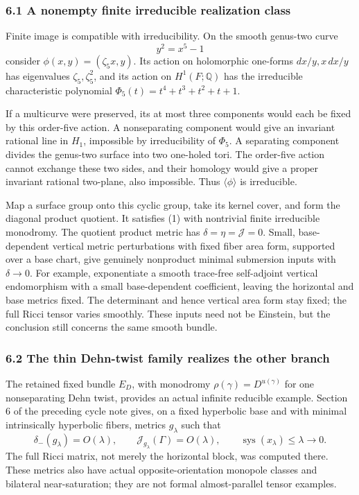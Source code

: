 \documentclass[
  11pt,
]{article}
\begin{document}
\hypertarget{a-nonempty-finite-irreducible-realization-class}{%
\subsubsection{6.1 A nonempty finite irreducible realization
class}\label{a-nonempty-finite-irreducible-realization-class}}

Finite image is compatible with irreducibility. On the smooth genus-two
curve \[
                           y^2=x^5-1
\tag{26}
\] consider \(\phi(x,y)=(\zeta_5x,y)\). Its action on holomorphic
one-forms \(dx/y,x\,dx/y\) has eigenvalues \(\zeta_5,\zeta_5^2\), and
its action on \(H^1(F;\mathbb Q)\) has the irreducible characteristic
polynomial \(\Phi_5(t)=t^4+t^3+t^2+t+1\).

If a multicurve were preserved, its at most three components would each
be fixed by this order-five action. A nonseparating component would give
an invariant rational line in \(H_1\), impossible by irreducibility of
\(\Phi_5\). A separating component divides the genus-two surface into
two one-holed tori. The order-five action cannot exchange these two
sides, and their homology would give a proper invariant rational
two-plane, also impossible. Thus \(\langle\phi\rangle\) is irreducible.

Map a surface group onto this cyclic group, take its kernel cover, and
form the diagonal product quotient. It satisfies (1) with nontrivial
finite irreducible monodromy. The quotient product metric has
\(\delta=\eta=\mathcal J=0\). Small, base-dependent vertical metric
perturbations with fixed fiber area form, supported over a base chart,
give genuinely nonproduct minimal submersion inputs with \(\delta\to0\).
For example, exponentiate a smooth trace-free self-adjoint vertical
endomorphism with a small base-dependent coefficient, leaving the
horizontal and base metrics fixed. The determinant and hence vertical
area form stay fixed; the full Ricci tensor varies smoothly. These
inputs need not be Einstein, but the conclusion still concerns the same
smooth bundle.

\hypertarget{the-thin-dehn-twist-family-realizes-the-other-branch}{%
\subsubsection{6.2 The thin Dehn-twist family realizes the other
branch}\label{the-thin-dehn-twist-family-realizes-the-other-branch}}

The retained fixed bundle \(E_D\), with monodromy
\(\rho(\gamma)=D^{u(\gamma)}\) for one nonseparating Dehn twist,
provides an actual infinite reducible example. Section 6 of the
preceding cycle note gives, on a fixed hyperbolic base and with minimal
intrinsically hyperbolic fibers, metrics \(g_\lambda\) such that \[
 \delta_-(g_\lambda)=O(\lambda),\qquad
 \mathcal J_{g_\lambda}(\Gamma)=O(\lambda),\qquad
              \operatorname{sys}(x_\lambda)\le\lambda\to0.
\tag{27}
\] The full Ricci matrix, not merely the horizontal block, was computed
there. These metrics also have actual opposite-orientation monopole
classes and bilateral near-saturation; they are not formal
almost-parallel tensor examples.
\end{document}
